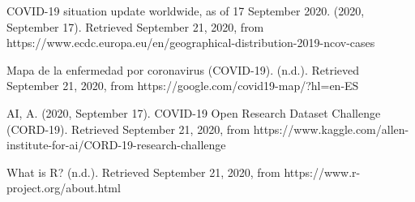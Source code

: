 \documentclass[10pt, a4paper]{article}
\begin{document}
\begin{thebibliography}{X}
 COVID-19 situation update worldwide, as of 17 September 2020. (2020, September 17). Retrieved September 21, 2020, from https://www.ecdc.europa.eu/en/geographical-distribution-2019-ncov-cases 
 
 Mapa de la enfermedad por coronavirus (COVID-19). (n.d.). Retrieved September 21, 2020, from https://google.com/covid19-map/?hl=en-ES

 AI, A. (2020, September 17). COVID-19 Open Research Dataset Challenge (CORD-19). Retrieved September 21, 2020, from https://www.kaggle.com/allen-institute-for-ai/CORD-19-research-challenge

 What is R? (n.d.). Retrieved September 21, 2020, from https://www.r-project.org/about.html
 

\end{thebibliography}    
    
\clearpage

    
  
\end{document}
